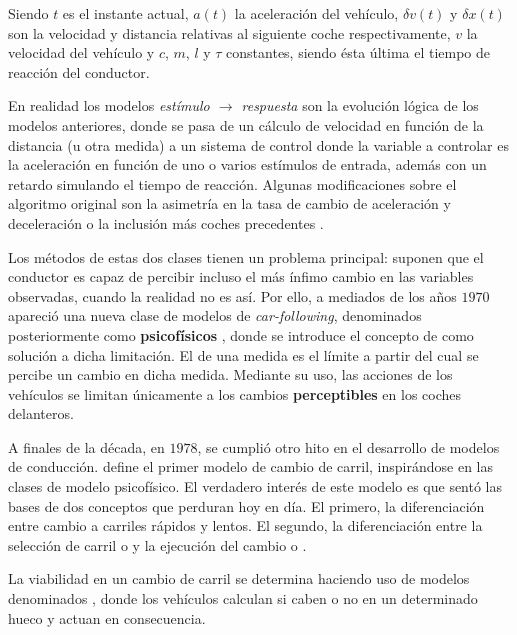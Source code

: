 	Siendo $t$ es el instante actual, $a(t)$ la aceleración del vehículo, $\delta v(t)$ y $\delta x(t)$ son la velocidad y distancia relativas al siguiente coche respectivamente, $v$ la velocidad del vehículo y $c$, $m$, $l$ y $\tau$ constantes, siendo ésta última el tiempo de reacción del conductor.

En realidad los modelos \textit{estímulo $\rightarrow$ respuesta} son la evolución lógica de los modelos anteriores, donde se pasa de un cálculo de velocidad en función de la distancia (u otra medida) a un sistema de control donde la variable a controlar es la aceleración en función de uno o varios estímulos de entrada, además con un retardo simulando el tiempo de reacción. Algunas modificaciones sobre el algoritmo original son la asimetría en la tasa de cambio de aceleración y deceleración \cite{Gazis1959} o la inclusión más coches precedentes \cite{Bexelius1968}.

Los métodos de estas dos clases tienen un problema principal: suponen que el conductor es capaz de percibir incluso el más ínfimo cambio en las variables observadas, cuando la realidad no es así. Por ello, a mediados de los años $1970$ apareció una nueva clase de modelos de \textit{\gls{car-following}}, denominados posteriormente como \textbf{psicofísicos} \cite{wiedemann1974simulation}, donde se introduce el concepto de \textit{} como solución a dicha limitación. El \textit{} de una medida es el límite a partir del cual se percibe un cambio en dicha medida. Mediante su uso, las acciones de los vehículos se limitan únicamente a los cambios \textbf{perceptibles} en los coches delanteros.

A finales de la década, en $1978$, se cumplió otro hito en el desarrollo de modelos de conducción. \cite{Sparmann1978} define el primer modelo de cambio de carril, inspirándose en las clases de modelo psicofísico. El verdadero interés de este modelo es que sentó las bases de dos conceptos que perduran hoy en día. El primero, la diferenciación entre cambio a carriles rápidos y lentos. El segundo, la diferenciación entre la selección de carril o \textit{} y la ejecución del cambio o \textit{}.

La viabilidad en un cambio de carril se determina haciendo uso de modelos denominados \textit{}, donde los vehículos calculan si caben o no en un determinado hueco y actuan en consecuencia.

